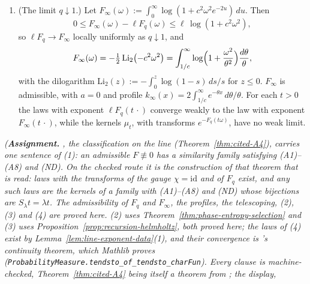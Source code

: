 \begin{theorem}
\begin{enumerate}
$ct|\omega| \ge 1$. In particular $h_t$ is unbounded. The convolution with each octave step
$L_{ct}$ is one forward and one backward first-order pass
(Proposition~\ref{prop:recursion-helmholtz}(1)).
\item (The limit $q \downarrow 1$.) Let
$F_\infty(\omega) := \int_0^\infty\log(1 + c^2\omega^2e^{-2u})\,du$. Then
\[
  0 \le F_\infty(\omega) - \ell F_q(\omega) \le \ell\,\log(1 + c^2\omega^2),
\]
so $\ell F_q \to F_\infty$ locally uniformly as $q \downarrow 1$, and
\begin{equation}\label{eq:line-e8}
  F_\infty(\omega) = -\tfrac12\,\mathrm{Li}_2\bigl(-c^2\omega^2\bigr)
  = \int_{1/c}^\infty\log\Bigl(1 + \frac{\omega^2}{\theta^2}\Bigr)\frac{d\theta}{\theta},
\end{equation}
with the dilogarithm $\mathrm{Li}_2(z) := -\int_0^z\log(1 - s)\,ds/s$ for $z \le 0$.
$F_\infty$ is admissible, with $a = 0$ and profile $k_\infty(x) = 2\int_{1/c}^\infty e^{-\theta x}\,d\theta/\theta$.
For each $t > 0$ the laws with exponent $\ell F_q(t\,\cdot)$ converge weakly to the law with exponent
$F_\infty(t\,\cdot)$, while the kernels $\mu_t$, with transforms $e^{-F_q(t\omega)}$, have no weak
limit.
\end{enumerate}
\statusA\quad{}\quad\emph{(\textbf{Assignment.} , the classification on the
line (Theorem~\ref{thm:cited-A4}), carries one sentence of (1): an admissible $F \not\equiv 0$ has a similarity
family satisfying (A1)--(A8) and (ND). On the checked route it is the construction of that
theorem that is read: laws with the transforms of the gauge $\chi = \mathrm{id}$ and of $F_q$
exist, and any such laws are the kernels of a family with (A1)--(A8) and (ND) whose bijections are
$S_\lambda t = \lambda t$. The admissibility of $F_q$ and $F_\infty$, the profiles, the
telescoping, (2), (3) and (4) are proved here. (2) uses
Theorem~\ref{thm:phase-entropy-selection} and (3) uses
Proposition~\ref{prop:recursion-helmholtz}, both proved here; the laws of (4) exist by
Lemma~\ref{lem:line-exponent-data}(1), and their convergence is \Levy's continuity theorem, which
Mathlib proves (\texttt{ProbabilityMeasure.tendsto\_of\_tendsto\_charFun}). Every clause is
machine-checked, Theorem~\ref{thm:cited-A4} being itself a theorem from ; the display,
}
\end{theorem}
